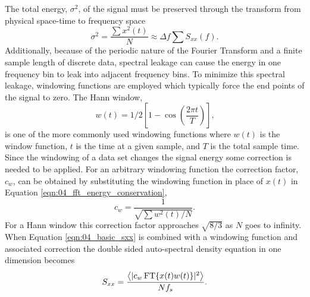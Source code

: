 The total energy, $\sigma^2$, of the signal must be preserved through the transform from physical space-time to frequency space
\begin{equation}
  \sigma^2 = \frac{\sum x^2(t)}{N} \approx \Delta f\sum S_{xx}(f) \textrm{.}
  \label{eqn:04_fft_energy_conservation}
\end{equation}
Additionally, because of the periodic nature of the Fourier Transform and a finite sample length of discrete data, spectral leakage can cause the energy in one frequency bin to leak into adjacent frequency bins.
To minimize this spectral leakage, windowing functions are employed which typically force the end points of the signal to zero.
The Hann window,
\begin{equation}
 w(t) = 1/2\left[1-\cos\left(\frac{2\pi t}{T}\right)\right] \textrm{,}
 \label{eqn:04_hann_window}
\end{equation}
is one of the more commonly used windowing functions \cite{Braun-2001-qhqBfvYz} where $w(t)$ is the window function, $t$ is the time at a given sample, and $T$ is the total sample time.
Since the windowing of a data set changes the signal energy some correction is needed to be applied.
For an arbitrary windowing function the correction factor, $c_w$, can be obtained by substituting the windowing function in place of $x(t)$ in Equation \ref{eqn:04_fft_energy_conservation},
\begin{equation}
 c_w = \frac{1}{\sqrt{\sum w^2(t)/N}} \textrm{.}
 \label{eqn:04_window_correction}
\end{equation}
For a Hann window this correction factor approaches $\sqrt{8/3}$ as $N$ goes to infinity.
When Equation \ref{eqn:04_basic_sxx} is combined with a windowing function and associated correction the double sided auto-spectral density equation in one dimension becomes
\begin{equation}
 S_{xx} = \frac{\left<|c_w\fft\{x(t) w(t)\}|^2\right>}{Nf_{s}} \textrm{.}
 \label{eqn:04_windowed_sxx}
\end{equation}


